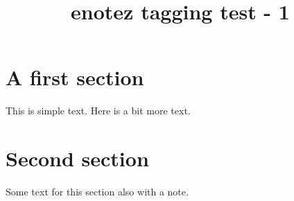 \documentclass{article}
\title{enotez tagging test - 1}
\begin{document}
\section{A first section}
This is simple text.
Here is a bit more text.
\section{Second section}
Some text
for this section also with a note.
\newpage \printendnotes[itemize]
\end{document}
